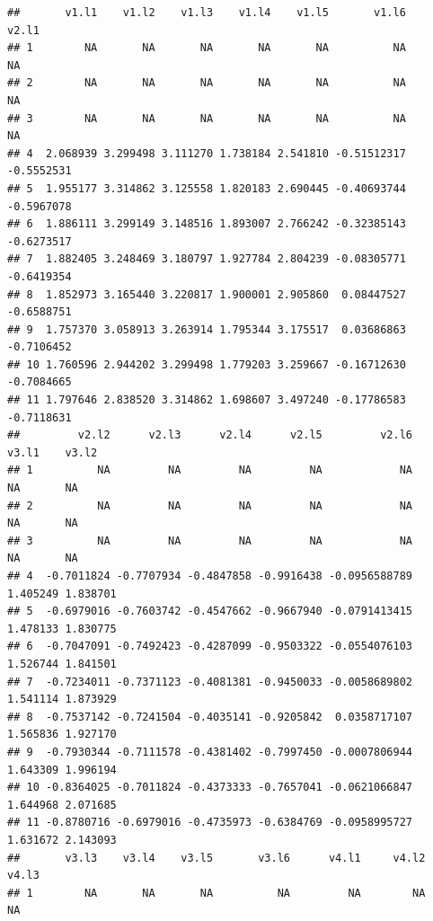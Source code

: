 \documentclass[
]{book}
\newenvironment{Shaded}{\begin{snugshade}}{\end{snugshade}}
\newcommand{\DecValTok}[1]{\textcolor[rgb]{0.00,0.00,0.81}{#1}}
\newcommand{\KeywordTok}[1]{\textcolor[rgb]{0.13,0.29,0.53}{\textbf{#1}}}
\newcommand{\NormalTok}[1]{#1}
\newcommand{\OperatorTok}[1]{\textcolor[rgb]{0.81,0.36,0.00}{\textbf{#1}}}
\newcommand{\StringTok}[1]{\textcolor[rgb]{0.31,0.60,0.02}{#1}}
\begin{document}
\begin{Shaded}
\end{Shaded}

\begin{verbatim}
##       v1.l1    v1.l2    v1.l3    v1.l4    v1.l5       v1.l6      v2.l1
## 1        NA       NA       NA       NA       NA          NA         NA
## 2        NA       NA       NA       NA       NA          NA         NA
## 3        NA       NA       NA       NA       NA          NA         NA
## 4  2.068939 3.299498 3.111270 1.738184 2.541810 -0.51512317 -0.5552531
## 5  1.955177 3.314862 3.125558 1.820183 2.690445 -0.40693744 -0.5967078
## 6  1.886111 3.299149 3.148516 1.893007 2.766242 -0.32385143 -0.6273517
## 7  1.882405 3.248469 3.180797 1.927784 2.804239 -0.08305771 -0.6419354
## 8  1.852973 3.165440 3.220817 1.900001 2.905860  0.08447527 -0.6588751
## 9  1.757370 3.058913 3.263914 1.795344 3.175517  0.03686863 -0.7106452
## 10 1.760596 2.944202 3.299498 1.779203 3.259667 -0.16712630 -0.7084665
## 11 1.797646 2.838520 3.314862 1.698607 3.497240 -0.17786583 -0.7118631
##         v2.l2      v2.l3      v2.l4      v2.l5         v2.l6    v3.l1    v3.l2
## 1          NA         NA         NA         NA            NA       NA       NA
## 2          NA         NA         NA         NA            NA       NA       NA
## 3          NA         NA         NA         NA            NA       NA       NA
## 4  -0.7011824 -0.7707934 -0.4847858 -0.9916438 -0.0956588789 1.405249 1.838701
## 5  -0.6979016 -0.7603742 -0.4547662 -0.9667940 -0.0791413415 1.478133 1.830775
## 6  -0.7047091 -0.7492423 -0.4287099 -0.9503322 -0.0554076103 1.526744 1.841501
## 7  -0.7234011 -0.7371123 -0.4081381 -0.9450033 -0.0058689802 1.541114 1.873929
## 8  -0.7537142 -0.7241504 -0.4035141 -0.9205842  0.0358717107 1.565836 1.927170
## 9  -0.7930344 -0.7111578 -0.4381402 -0.7997450 -0.0007806944 1.643309 1.996194
## 10 -0.8364025 -0.7011824 -0.4373333 -0.7657041 -0.0621066847 1.644968 2.071685
## 11 -0.8780716 -0.6979016 -0.4735973 -0.6384769 -0.0958995727 1.631672 2.143093
##       v3.l3    v3.l4    v3.l5       v3.l6      v4.l1     v4.l2     v4.l3
## 1        NA       NA       NA          NA         NA        NA        NA

\end{verbatim}
\end{document}
